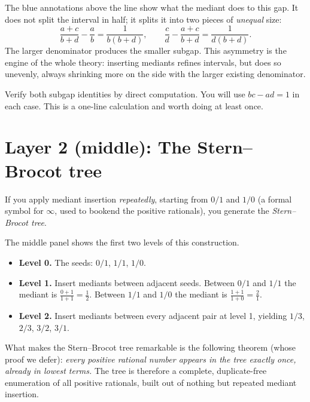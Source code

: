 \medskip

The blue annotations above the line show what the mediant does to this
gap.  It does not split the interval in half; it splits it into two
pieces of \emph{unequal} size:
\[
\frac{a+c}{b+d} - \frac{a}{b} = \frac{1}{b(b+d)},
\qquad
\frac{c}{d} - \frac{a+c}{b+d} = \frac{1}{d(b+d)}.
\]
The larger denominator produces the smaller subgap.
This asymmetry is the engine of the whole theory: inserting mediants
refines intervals, but does so unevenly, always shrinking more on the
side with the larger existing denominator.

\medskip

\begin{remark*}
Verify both subgap identities by direct computation.
You will use $bc - ad = 1$ in each case.
This is a one-line calculation and worth doing at least once.
\end{remark*}

\bigskip

\section*{Layer 2 (middle): The Stern--Brocot tree}

If you apply mediant insertion \emph{repeatedly}, starting from
$0/1$ and $1/0$ (a formal symbol for $\infty$, used to bookend the
positive rationals), you generate the \emph{Stern--Brocot tree}.

\medskip

The middle panel shows the first two levels of this construction.
\begin{itemize}
  \item \textbf{Level 0.} The seeds: $0/1$, $1/1$, $1/0$.
  \item \textbf{Level 1.} Insert mediants between adjacent seeds.
        Between $0/1$ and $1/1$ the mediant is
        $\frac{0+1}{1+1} = \frac{1}{2}$.
        Between $1/1$ and $1/0$ the mediant is
        $\frac{1+1}{1+0} = \frac{2}{1}$.
  \item \textbf{Level 2.} Insert mediants between every adjacent pair
        at level 1, yielding $1/3$, $2/3$, $3/2$, $3/1$.
\end{itemize}

\medskip

What makes the Stern--Brocot tree remarkable is the following theorem
(whose proof we defer): \emph{every positive rational number appears
in the tree exactly once, already in lowest terms.}
The tree is therefore a complete, duplicate-free enumeration of all
positive rationals, built out of nothing but repeated mediant
insertion.


